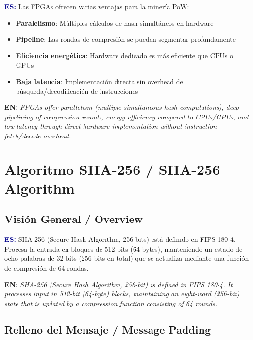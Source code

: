\documentclass[12pt,a4paper]{article}
\newcommand{\bsection}[2]{%
    \section{#1 \textnormal{\normalsize\color{accentblue}/ #2}}%
}
\newcommand{\bsubsection}[2]{%
    \subsection{#1 \textnormal{\small\color{accentblue}/ #2}}%
}
\newenvironment{bilingual}{%
    \par\medskip
}{%
    \par\medskip
}
\newcommand{\espara}[1]{\noindent\textcolor{darkblue}{\textbf{ES:}} #1\par\smallskip}
\newcommand{\enpara}[1]{\noindent\textcolor{accentblue}{\textbf{EN:}} \textit{#1}\par\smallskip}
\begin{document}
\begin{bilingual}
\espara{%
Las FPGAs ofrecen varias ventajas para la miner\'ia PoW:
\begin{itemize}[leftmargin=2em]
    \item \textbf{Paralelismo}: M\'ultiples c\'alculos de hash simult\'aneos en hardware
    \item \textbf{Pipeline}: Las rondas de compresi\'on se pueden segmentar profundamente
    \item \textbf{Eficiencia energ\'etica}: Hardware dedicado es m\'as eficiente que CPUs o GPUs
    \item \textbf{Baja latencia}: Implementaci\'on directa sin overhead de b\'usqueda/decodificaci\'on de instrucciones
\end{itemize}}

\enpara{%
FPGAs offer parallelism (multiple simultaneous hash computations), deep
pipelining of compression rounds, energy efficiency compared to CPUs/GPUs,
and low latency through direct hardware implementation without instruction
fetch/decode overhead.}
\end{bilingual}

\bsection{Algoritmo SHA-256}{SHA-256 Algorithm}

\bsubsection{Visi\'on General}{Overview}

\begin{bilingual}
\espara{%
SHA-256 (Secure Hash Algorithm, 256 bits) est\'a definido en FIPS 180-4.
Procesa la entrada en bloques de 512 bits (64 bytes), manteniendo un estado
de ocho palabras de 32 bits (256 bits en total) que se actualiza mediante
una funci\'on de compresi\'on de 64 rondas.}

\enpara{%
SHA-256 (Secure Hash Algorithm, 256-bit) is defined in FIPS 180-4.
It processes input in 512-bit (64-byte) blocks, maintaining an eight-word
(256-bit) state that is updated by a compression function consisting of
64 rounds.}
\end{bilingual}

\bsubsection{Relleno del Mensaje}{Message Padding}
\end{document}
